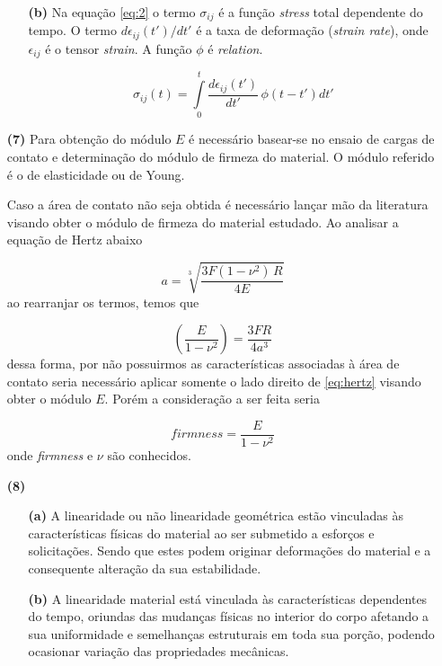 \documentclass[a4paper, 12pt, brazilian]{article}
\begin{document}
\begin{itemize}
\begin{itemize}
			
			\item[\textbf{(b)}] Na equação \eqref{eq:2} o termo $\sigma_{ij}$ é a função \textit{stress} total dependente do tempo. O termo $d\epsilon_{ij}(t')/dt'$ é a taxa de deformação (\textit{strain rate}), onde $\epsilon_{ij}$ é o tensor \textit{strain}. A função $\phi$ é \textit{relation}.
			
			\begin{equation}
				\label{eq:2}
				\sigma_{ij}(t)=\int\limits_{0}^{t}\dfrac{d\epsilon_{ij}(t')}{dt'}\,\phi(t-t')dt'
			\end{equation}
		\end{itemize}
		
		\item[\textbf{(7)}] Para obtenção do módulo $E$ é necessário basear-se no ensaio de cargas de contato e determinação do módulo de firmeza do material. O módulo referido é o de elasticidade ou de Young. 
		
		Caso a área de contato não seja obtida é necessário lançar mão da literatura visando obter o módulo de firmeza do material estudado. Ao analisar a equação de Hertz abaixo
		
		\begin{equation}
			a=\sqrt[3]{\dfrac{3F(1-\nu^{2})\,R}{4E}}
		\end{equation}
		ao rearranjar os termos, temos que
		
		\begin{equation}
			\label{eq:hertz}
			\left(\dfrac{E}{1-\nu^{2}}\right)=\dfrac{3FR}{4a^{3}}
		\end{equation}
		dessa forma, por não possuirmos as características associadas à área de contato seria necessário aplicar somente o lado direito de \eqref{eq:hertz} visando obter o módulo $E$. Porém a consideração a ser feita seria
		
		\begin{equation}
			\textit{firmness}=\dfrac{E}{1-\nu^{2}}
		\end{equation}
		onde \textit{firmness} e $\nu$ são conhecidos.
	
		\item[\textbf{(8)}]		
		
		\begin{itemize}
			\item[\textbf{(a)}] A linearidade ou não linearidade geométrica estão vinculadas às características físicas do material ao ser submetido a esforços e solicitações. Sendo que estes podem originar deformações do material e a consequente alteração da sua estabilidade.
			\item[\textbf{(b)}] A linearidade material está vinculada às características dependentes do tempo, oriundas das mudanças físicas no interior do corpo afetando a sua uniformidade e semelhanças estruturais em toda sua porção, podendo ocasionar variação das propriedades mecânicas.
		\end{itemize}
	

\end{itemize}
\end{document}
